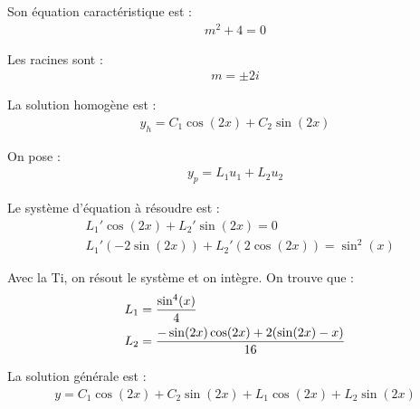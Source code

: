 Son équation caractéristique est :
\begin{align*}
    m^2 + 4 = 0
\end{align*}

Les racines sont :
\begin{align*}
    m = \pm2i
\end{align*}

La solution homogène est :
\begin{align*}
    y_h = C_1\cos(2x) + C_2\sin(2x)
\end{align*}

On pose :
\begin{align*}
    y_p = L_1u_1 + L_2u_2
\end{align*}

Le système d'équation à résoudre est :
\begin{align*}
    &L_1' \cos(2x) + L_2' \sin(2x) = 0 \\
    &L_1'(-2\sin(2x)) + L_2'(2\cos(2x)) = \sin^2(x)
\end{align*}

Avec la Ti, on résout le système et on intègre. On trouve que :
\begin{align*}
    L_1 &= \dfrac{\sin^4(x)}{4} \\
    L_2 &= \dfrac{-\sin(2x)\cos(2x) + 2(\sin(2x)-x)}{16}
\end{align*}

La solution générale est :
\begin{align*}
    y = C_1\cos(2x) + C_2\sin(2x) + L_1\cos(2x) + L_2\sin(2x)
\end{align*}
